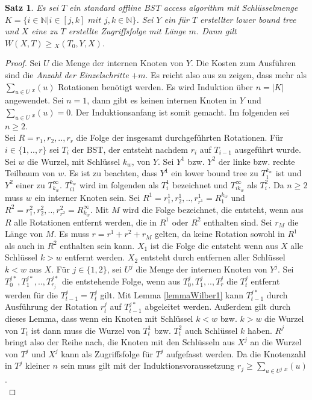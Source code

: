 \documentclass[a4paper,12pt]{article}
\begin{document}
\newtheorem{Satz1}{Satz}[section] \label{satzWilber1}
\begin{Satz1} Es sei $T$ ein standard offline BST access algorithm mit Schlüsselmenge ${K = \{  i \in \mathbb{N} \vert i \in \left[j,k\right] \textit{ mit } j,k \in  \mathbb{N} \}} $. Sei $Y$ ein für $T$ erstellter lower bound tree und $X$ eine zu $T$ erstellte Zugriffsfolge mit Länge $m$. Dann gilt  $W\left(X, T\right) \geq {_X(T_0, Y, X)} $.  
\end{Satz1}
\begin{proof}
Sei $U$ die Menge der internen Knoten von $Y$. Die Kosten zum Ausführen sind die \textit{Anzahl der Einzelschritte} $ + {m}$. Es reicht also aus zu zeigen, dass mehr als $\sum_{u \in U} {_x} (u)$ Rotationen benötigt werden. Es wird Induktion über  $n = \vert K \vert$ angewendet. Sei $n = 1$, dann gibt es keinen internen Knoten in $Y$ und $\sum_{u \in U} {_x} (u) = 0$. Der Induktionsanfang ist somit gemacht. Im folgenden sei $n \geq 2$.\\
Sei $R = r_1,r_2,..,r_r$ die Folge der insgesamt durchgeführten Rotationen. Für $i \in \{1,..,r\}$ sei $T_i$ der BST, der entsteht nachdem $r_i$ auf $T_{i-1}$ ausgeführt wurde. Sei $w$ die Wurzel, mit Schlüssel $k_w$, von $Y$. Sei $Y^1$ bzw. $Y^2$ der linke bzw. rechte Teilbaum von $w$. Es ist zu beachten, dass $Y^1$ ein lower bound tree zu $T_{1}^{k_w}$ ist und  $Y^2$ einer zu $T^\infty_{k_w}$. $T_{i1}^{k_w}$ wird im folgenden als $T^1_i$ bezeichnet und $T_{ik_w}^{\infty}$ als $T^2_i$. Da $n \geq 2$ muss $w$ ein interner Knoten sein. Sei  $R^1 = r^1_1,r^1_2,..,r^1_{r^1} = R^{k_w}_1$ und $R^2 = r^2_1,r^2_2,..,r^2_{r^2} = R^\infty_{k_w}$. Mit $M$ wird die Folge bezeichnet, die entsteht, wenn aus $R$ alle Rotationen entfernt werden, die in $R^1$ oder $R^2$ enthalten sind. Sei $r_M$ die Länge von $M$. Es muss $r = r^1 + r^2 + r_M$ gelten, da keine Rotation sowohl in $R^1$ als auch in $R^2$ enthalten sein kann. $X_1$ ist die Folge die entsteht wenn aus $X$ alle Schlüssel $k > w$ entfernt werden. $X_2$ entsteht durch entfernen aller Schlüssel $k < w$ aus $X$. Für $j \in \{1,2\}$, sei $U^j$ die Menge der internen Knoten von $Y^j$. Sei $T^{j*}_0,T^{j*}_1,..,T^{j*}_{r_j}$ die entstehende Folge, wenn aus $T^{j}_0,T^{j}_1,..,T^{j}_{r}$ die $T^j_t$ entfernt werden für die $T^j_{t-1} = T^j_t$ gilt. Mit Lemma \ref{lemmaWilber1} kann  $T^{j*}_{t-1}$ durch Ausführung der Rotation $r^j_t$ auf $T^{j*}_{t-1}$ abgeleitet werden. Außerdem gilt durch dieses Lemma, dass wenn ein Knoten mit Schlüssel $k < w$ bzw. $k > w$ die Wurzel von $T_t$ ist dann muss die Wurzel von $T^1_t$ bzw. $T^2_t$ auch Schlüssel $k$ haben. $R^j$ bringt also der Reihe nach, die Knoten mit den Schlüsseln aus $X^j$ an die Wurzel von $T^j$ und  $X^j$ kann als Zugriffsfolge für $T^j$ aufgefasst werden. Da die Knotenzahl in $T^j$ kleiner $n$ sein muss gilt mit der Induktionsvoraussetzung  $r_j \geq \sum_{u \in U^j} {_x} (u)$.\\

\end{proof}
\end{document}

